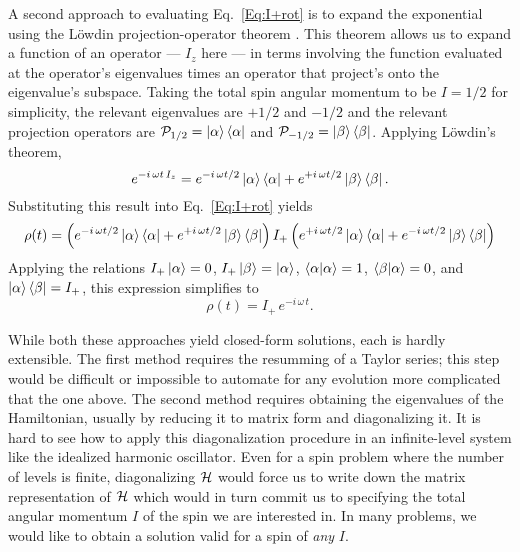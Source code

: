  A second approach to evaluating Eq.~\ref{Eq:I+rot} is to expand the exponential using the L\"{o}wdin projection-operator theorem \cite{Lowdin1955mar}.  This theorem allows us to expand a function of an operator --- $I_z$ here --- in terms involving the function evaluated at the operator's eigenvalues times an operator that project's onto the eigenvalue's subspace.  Taking the total spin angular momentum to be $I = 1/2$ for simplicity, the relevant eigenvalues are $+1/2$ and $-1/2$ and the relevant projection operators are ${\cal P}_{1/2} = \ket{\alpha}\bra{\alpha}$ and ${\cal P}_{-1/2} = \ket{\beta}\bra{\beta}$.  Applying L\"{o}wdin's theorem,
\begin{equation}
e^{-i \, \omega t \, I_z} 
	= e^{-i \, \omega t / 2} \ket{\alpha}\bra{\alpha}
	+ e^{+i \, \omega t / 2} \ket{\beta}\bra{\beta}.
\end{equation}
Substituting this result into Eq.~\ref{Eq:I+rot} yields
\[
\rho(t) = \left( e^{-i \, \omega t / 2} \ket{\alpha}\bra{\alpha}
	+ e^{+i \, \omega t / 2} \ket{\beta}\bra{\beta} \right)
	I_{+} \left( e^{+i \, \omega t / 2} \ket{\alpha}\bra{\alpha}
	+ e^{-i \, \omega t / 2} \ket{\beta}\bra{\beta} \right)
\]
Applying the relations $I_{+} \ket{\alpha} = 0$, $I_{+} \ket{\beta} = \ket{\alpha}$, $\braket{\alpha|\alpha} = 1$, $\braket{\beta|\alpha} = 0$, and $\ket{\alpha} \bra{\beta} = I_{+}$, this expression simplifies to
\begin{equation}
\rho(t) 
	= I_{+} \, e^{-i \, \omega \, t}.
	\label{Eq:I+-soln-method-2}
\end{equation} 

While both these approaches yield closed-form solutions, each is hardly extensible.  The first method requires the resumming of a Taylor series; this step would be difficult or impossible to automate for any evolution more complicated that the one above.  The second method requires obtaining the eigenvalues of the Hamiltonian, usually by reducing it to matrix form and diagonalizing it.  It is hard to see how to apply this diagonalization procedure in an infinite-level system like the idealized harmonic oscillator. Even for a spin problem where the number of levels is finite, diagonalizing ${\cal H}$ would force us to write down the matrix representation of ${\cal H}$ which would in turn commit us to specifying the total angular momentum $I$ of the spin we are interested in.  In many problems, we would like to obtain a solution valid for a spin of \emph{any} $I$.  

